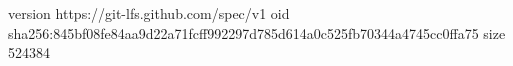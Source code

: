 version https://git-lfs.github.com/spec/v1
oid sha256:845bf08fe84aa9d22a71fcff992297d785d614a0c525fb70344a4745cc0ffa75
size 524384

